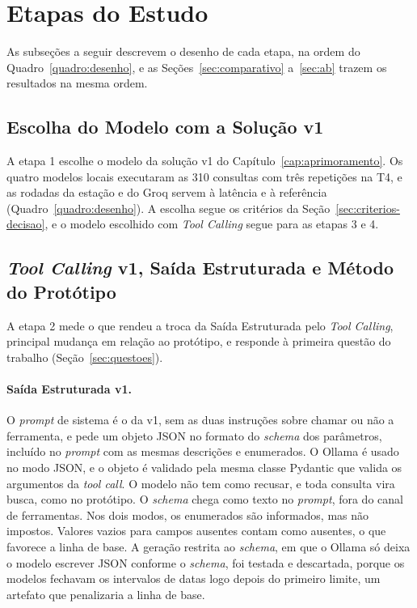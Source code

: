\section{Etapas do Estudo}
\label{sec:etapas}

As subseções a seguir descrevem o desenho de cada etapa, na ordem do Quadro~\ref{quadro:desenho}, e as Seções~\ref{sec:comparativo} a~\ref{sec:ab} trazem os resultados na mesma ordem.

\subsection{Escolha do Modelo com a Solução v1}
\label{sec:etapa-v1}

A etapa 1 escolhe o modelo da solução v1 do Capítulo~\ref{cap:aprimoramento}. Os quatro modelos locais executaram as 310 consultas com três repetições na T4, e as rodadas da estação e do Groq servem à latência e à referência (Quadro~\ref{quadro:desenho}). A escolha segue os critérios da Seção~\ref{sec:criterios-decisao}, e o modelo escolhido com \textit{Tool Calling} segue para as etapas 3 e 4.

\subsection{\texorpdfstring{\textit{Tool Calling}}{Tool Calling} v1, Saída Estruturada e Método do Protótipo}
\label{sec:linhas-de-base}

A etapa 2 mede o que rendeu a troca da Saída Estruturada pelo \textit{Tool Calling}, principal mudança em relação ao protótipo, e responde à primeira questão do trabalho (Seção~\ref{sec:questoes}).

\paragraph{Saída Estruturada v1.} O \textit{prompt} de sistema é o da v1, sem as duas instruções sobre chamar ou não a ferramenta, e pede um objeto JSON no formato do \textit{schema} dos parâmetros, incluído no \textit{prompt} com as mesmas descrições e enumerados. O Ollama é usado no modo JSON, e o objeto é validado pela mesma classe Pydantic que valida os argumentos da \textit{tool call}. O modelo não tem como recusar, e toda consulta vira busca, como no protótipo. O \textit{schema} chega como texto no \textit{prompt}, fora do canal de ferramentas. Nos dois modos, os enumerados são informados, mas não impostos. Valores vazios para campos ausentes contam como ausentes, o que favorece a linha de base. A geração restrita ao \textit{schema}, em que o Ollama só deixa o modelo escrever JSON conforme o \textit{schema}, foi testada e descartada, porque os modelos fechavam os intervalos de datas logo depois do primeiro limite, um artefato que penalizaria a linha de base.


